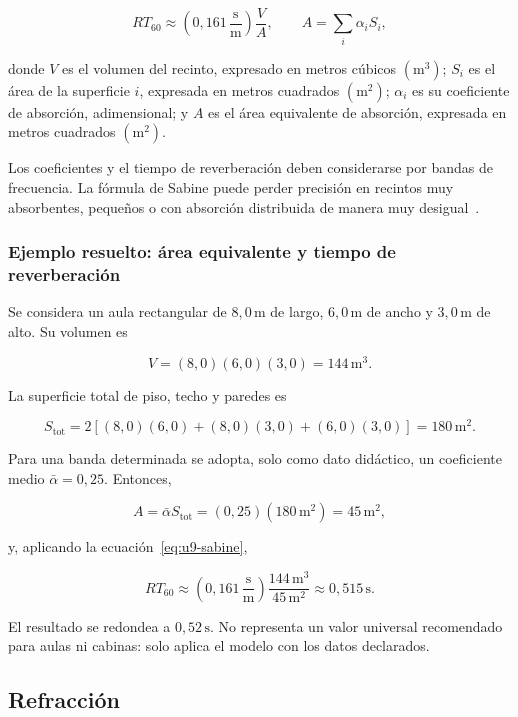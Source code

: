 \begin{equation}
    RT_{60}
      \approx
      \left(0{,}161\,\frac{\text{s}}{\text{m}}\right)\frac{V}{A},
    \qquad
    A=\sum_i \alpha_i S_i,
    \label{eq:u9-sabine}
\end{equation}

donde \(V\) es el volumen del recinto, expresado en metros cúbicos
\((\text{m}^3)\); \(S_i\) es el área de la superficie \(i\), expresada en
metros cuadrados \((\text{m}^2)\); \(\alpha_i\) es su coeficiente de absorción,
adimensional; y \(A\) es el área equivalente de absorción, expresada en metros
cuadrados \((\text{m}^2)\).

Los coeficientes y el tiempo de reverberación deben considerarse por
bandas de frecuencia. La fórmula de Sabine puede perder precisión en recintos
muy absorbentes, pequeños o con absorción distribuida de manera muy desigual~\cite{moser2009,iso3382_2_2008}.

\subsubsection*{Ejemplo resuelto: área equivalente y tiempo de reverberación}

Se considera un aula rectangular de \(8{,}0\,\text{m}\) de largo,
\(6{,}0\,\text{m}\) de ancho y \(3{,}0\,\text{m}\) de alto. Su volumen es

\[
    V=(8{,}0)(6{,}0)(3{,}0)=144\,\text{m}^3.
\]

La superficie total de piso, techo y paredes es

\[
    S_\mathrm{tot}
      =2[(8{,}0)(6{,}0)+(8{,}0)(3{,}0)+(6{,}0)(3{,}0)]
      =180\,\text{m}^2.
\]

Para una banda determinada se adopta, solo como dato didáctico, un coeficiente
medio \(\bar{\alpha}=0{,}25\). Entonces,

\[
    A=\bar{\alpha}S_\mathrm{tot}
      =(0{,}25)(180\,\text{m}^2)
      =45\,\text{m}^2,
\]

y, aplicando la ecuación~\eqref{eq:u9-sabine},

\[
    RT_{60}
      \approx
      \left(0{,}161\,\frac{\text{s}}{\text{m}}\right)
      \frac{144\,\text{m}^3}{45\,\text{m}^2}
      \approx0{,}515\,\text{s}.
\]

El resultado se redondea a \(0{,}52\,\text{s}\). No representa un valor
universal recomendado para aulas ni cabinas: solo aplica el modelo con los
datos declarados.

\subsection{Refracción}
\label{sec:u9-refraccion}

